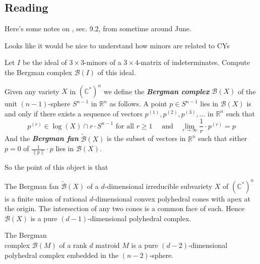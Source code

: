 \subsection{Reading \cite{sturm}}

Here's some notes on \cite{sturm}, sec. 9.2, from sometime around June.
\vspace{1em}

{\color{orange}Looks like it would be nice to understand how minors are related to CYs}

\begin{exercise}[Sturmfel, 9.5.3]
	Let $I$  be the ideal of $3\times 3$-minors of a $3\times 4$-matrix of indeterminates. Compute the Bergman complex $\mathcal{B}(I)$ of this ideal.
\end{exercise}

\begin{defn}
	Given any variety $X$  in $(\mathbb{C}^*)^n$  we define the \textit{\textbf{Bergman complex}} $\mathcal{B}(X)$  of the unit $(n-1)$-sphere $S^{n-1}$  in $\mathbb{R}^n$  as follows. A point $p \in S^{n-1}$ lies in $\mathcal{B}(X)$ is and only if there exists a sequence of vectors $p^{(1)},p^{(2)},p^{(3)},\ldots$ in $\mathbb{R}^n$ such that
\begin{equation*}
	p^{(r)}\in \log(X)\cap r\cdot S^{n-1}\text{ for all } r\geq 1\quad\text{ and}\quad \lim_{r \to \infty} \frac{1}{r} \cdot p^{(r)}=p	
\end{equation*}
	And the \textit{\textbf{Bergman fan}} $\widetilde{\mathcal{B}}(X)$  is the subset of vectors in $\mathbb{R}^n$  such that either $p=0$  of $\frac{1}{\|p\|} \cdot p$  lies in $\mathcal{B}(X)$.
\end{defn}
So the point of this object is that
\begin{thm}
	The Bergman fan $\widetilde{\mathcal{B}}(X)$ of a $d$-dimensional irreducible subvariety $X$ of $(\mathbb{C}^*)^n$ is a finite union of rational $d$-dimensional convex polyhedral cones with apex at the origin. The intersection of any two cones is a common face of each. Hence $\mathcal{B}(X)$ is a pure $(d-1)$-dimensional polyhedral complex.
\end{thm}

\begin{thm}
	The Bergman \\complex $\mathcal{B}(M)$ of a rank $d$ matroid $M$ is a pure $(d-2)$-dimensional polyhedral complex embedded in the $(n-2)$-sphere.
\end{thm}

